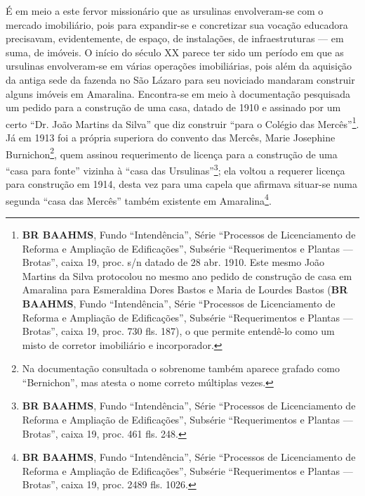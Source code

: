 É em meio a este fervor missionário que as ursulinas envolveram-se com o mercado imobiliário, pois para expandir-se e concretizar sua vocação educadora precisavam, evidentemente, de espaço, de instalações, de infraestruturas --- em suma, de imóveis. O início do século XX parece ter sido um período em que as ursulinas envolveram-se em várias operações imobiliárias, pois além da aquisição da antiga sede da fazenda no São Lázaro para seu noviciado mandaram construir alguns imóveis em Amaralina. Encontra-se em meio à documentação pesquisada um pedido para a construção de uma casa, datado de 1910 e assinado por um certo ``Dr. João Martins da Silva'' que diz construir ``para o Colégio das Mercês''\footnote{\textbf{BR BAAHMS}, Fundo ``Intendência'', Série ``Processos de Licenciamento de Reforma e Ampliação de Edificações'', Subsérie ``Requerimentos e Plantas --- Brotas'', caixa 19, proc. s/n datado de 28 abr. 1910. Este mesmo João Martins da Silva protocolou no mesmo ano pedido de construção de casa em Amaralina para Esmeraldina Dores Bastos e Maria de Lourdes Bastos (\textbf{BR BAAHMS}, Fundo ``Intendência'', Série ``Processos de Licenciamento de Reforma e Ampliação de Edificações'', Subsérie ``Requerimentos e Plantas --- Brotas'', caixa 19, proc. 730 fls. 187), o que permite entendê-lo como um misto de corretor imobiliário e incorporador.}. Já em 1913 foi a própria superiora do convento das Mercês, Marie Josephine Burnichon\footnote{Na documentação consultada o sobrenome também aparece grafado como ``Bernichon'', mas  atesta o nome correto múltiplas vezes.}, quem assinou requerimento de licença para a construção de uma ``casa para fonte'' vizinha à ``casa das Ursulinas''\footnote{\textbf{BR BAAHMS}, Fundo ``Intendência'', Série ``Processos de Licenciamento de Reforma e Ampliação de Edificações'', Subsérie ``Requerimentos e Plantas --- Brotas'', caixa 19, proc. 461 fls. 248.}; ela voltou a requerer licença para construção em 1914, desta vez para uma capela que afirmava situar-se numa segunda ``casa das Mercês'' também existente em Amaralina\footnote{\textbf{BR BAAHMS}, Fundo ``Intendência'', Série ``Processos de Licenciamento de Reforma e Ampliação de Edificações'', Subsérie ``Requerimentos e Plantas --- Brotas'', caixa 19, proc. 2489 fls. 1026.}. 

